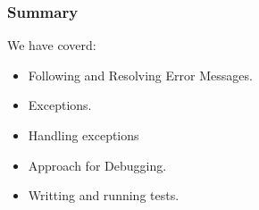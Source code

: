 \documentclass[compress,14pt]{beamer}
\newcounter{time}
\newcommand{\inctime}[1]{\addtocounter{time}{#1}{\vspace*{0.1in}\tiny \thetime\ m}}
\begin{document}
    

\begin{frame}
  \frametitle{Summary}
We have coverd:
  \begin{itemize}
  \item Following and Resolving Error Messages.
  \item Exceptions.
  \item Handling exceptions
  \item Approach for Debugging.
  \item Writting and running tests.
  \end{itemize}
\end{frame}
\end{document}
